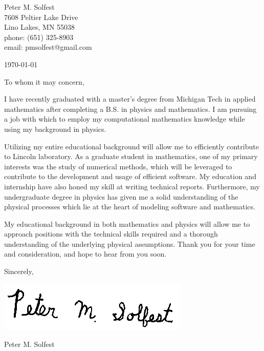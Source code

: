 \documentclass[letterpaper,12pt]{article}
\begin{document}
Peter M. Solfest\\
7608 Peltier Lake Drive\\
Lino Lakes, MN 55038\\
phone: (651) 325-8903\\
email: pmsolfest@gmail.com

\today


To whom it may concern, %

I have recently graduated with a master's degree from Michigan Tech in applied mathematics after
completing a B.S. in physics and mathematics.
I am pursuing a job with which to employ my computational mathematics knowledge
while using my background in physics.

Utilizing my entire educational background will allow me to efficiently
contribute to Lincoln laboratory.
As a graduate student in mathematics, one of my primary interests was the study of numerical methods,
which will be leveraged to contribute to the development and usage of efficient software.
My education and internship have also honed my skill at writing technical reports.
Furthermore, my undergraduate degree in physics has given me a solid understanding of the
physical processes which lie at the heart of modeling software and mathematics.

My educational background in both mathematics and physics will allow 
me to approach positions with the technical skills required and a thorough understanding
of the underlying physical assumptions.
Thank you for your time and consideration, and hope to hear from you soon.

Sincerely,

\includegraphics[height=.5in]{signature.png}

Peter M. Solfest
\end{document}
